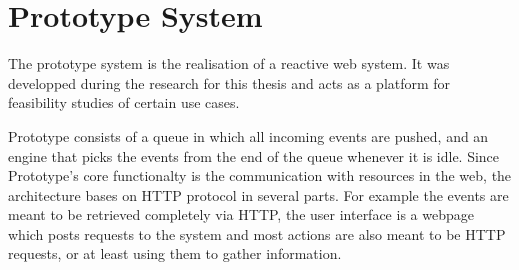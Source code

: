 
\chapter{Prototype System}
%

% 


The prototype system is the realisation of a reactive web system.
It was developped during the research for this thesis and acts as a platform for feasibility studies of certain use cases.


Prototype consists of a queue in which all incoming events are pushed, and an engine that picks the events from the end of the queue whenever it is idle.
Since Prototype's core functionalty is the communication with resources in the web, the architecture bases on HTTP protocol in several parts.
For example the events are meant to be retrieved completely via HTTP, the user interface is a webpage which posts requests to the system and most actions are also meant to be HTTP requests, or at least using them to gather information.



